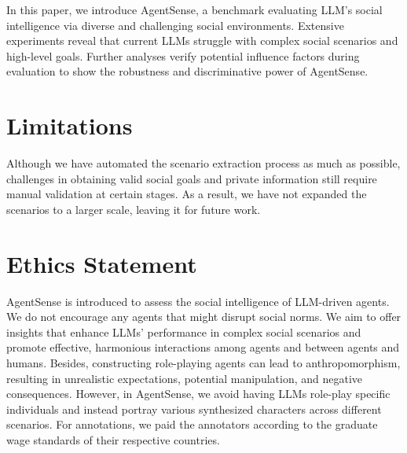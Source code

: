 In this paper, we introduce AgentSense, a benchmark evaluating LLM's social intelligence via diverse and challenging social environments.
Extensive experiments reveal that current LLMs struggle with complex social scenarios and high-level goals.
Further analyses verify potential influence factors during evaluation to show the robustness and discriminative power of AgentSense.


\section*{Limitations}

Although we have automated the scenario extraction process as much as possible, challenges in obtaining valid social goals and private information still require manual validation at certain stages. As a result, we have not expanded the scenarios to a larger scale, leaving it for future work. 

\section*{Ethics Statement}

AgentSense is introduced to assess the social intelligence of LLM-driven agents. We do not encourage any agents that might disrupt social norms. We aim to offer insights that enhance LLMs' performance in complex social scenarios and promote effective, harmonious interactions among agents and between agents and humans. Besides, constructing role-playing agents can lead to anthropomorphism, resulting in unrealistic expectations, potential manipulation, and negative consequences. However, in AgentSense, we avoid having LLMs role-play specific individuals and instead portray various synthesized characters across different scenarios. For annotations, we paid the annotators according to the graduate wage standards of their respective countries.

